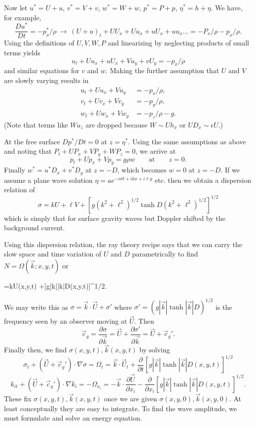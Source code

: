 Now let $u^*=U+u$, $v^*=V+v$, $w^*=W+w$, $p^*=P+p$, $\eta^*=h+\eta$. We
have, for example,
\[
	\frac{Du^*}{Dt}=-p_x^*/\rho
	\ \longrightarrow\
	(U+u)_t+UU_x+Uu_x+uU_x+uu_x\ldots=-P_x/\rho-p_x/\rho.
\]
Using the definitions of $U,V,W,P$ and linearizing by neglecting products of small
terms yields
\[
	u_t+Uu_x+uU_x+Vu_y+vU_y=-p_x/\rho
\]
and similar equations for $v$ and $w$. Making the further assumption that $U$ and $V$ are
slowly varying results in
\begin{align*}
	u_t+Uu_x+Vu_y & =-p_x/\rho,   \\
	v_t+Uv_x+Vv_y & =-p_y/\rho,   \\
	w_t+Uw_x+Vw_y & =-p_z/\rho-g.
\end{align*}
(Note that terms like $Wu_z$ are dropped because $W\sim Uh_x$ or $UD_x\sim\epsilon U$.)

\sourcepagebreak

At the free surface $Dp^*/Dt=0$ at $z=\eta^*$. Using the same assumptions as above
and noting that $P_t+UP_x+VP_y+WP_z=0$, we arrive at
\[
	p_t+Up_x+Vp_y=g\rho w\qquad\text{at}\qquad z=0.
\]
Finally $w^*=u^*D_x+v^*D_y$ at $z=-D$, which becomes $w=0$ at $z=-D$. If we assume
a plane wave solution $\eta=ae^{-i\sigma t+ikx+i\ell y}$ etc. then we obtain a dispersion relation of
\[
	\sigma=kU+\ell V+
	\left[g(k^2+\ell^2)^{1/2}\tanh D(k^2+\ell^2)^{1/2}\right]^{1/2}
\]
which is simply that for surface gravity waves but Doppler shifted by the background
current.

Using this dispersion relation, the ray theory recipe says that we can carry the
slow space and time variation of $U$ and $D$ parametrically to find
$N=\Omega(\vec k;x,y,t)$ or
\begin{waveequation}
	\sigma=\vec k\cdot\vec U(x,y,t)
		+[g|\vec k|\tanh|\vec k|D(x,y,t)]^{1/2}.
\end{waveequation}
We may write this as $\sigma=\vec k\cdot\vec U+\sigma'$ where
$\sigma'=(g|\vec k|\tanh|\vec k|D)^{1/2}$ is the frequency seen
by an observer moving at $\vec U$. Then
\[
	\vec c_g=\frac{\partial\sigma}{\partial\vec k}
	=\vec U+\frac{\partial\sigma'}{\partial\vec k}
	=\vec U+\vec c_g'.
\]
Finally then, we find $\sigma(x,y,t),\vec k(x,y,t)$ by solving
\[
	\sigma_t+(\vec U+\vec c_g')\cdot\nabla\sigma
	=\Omega_t
	=\vec k\cdot\vec U_t
	+\frac{\partial}{\partial t}[g|\vec k|\tanh|\vec k|D(x,y,t)]^{1/2}
\]
\[
	k_{it}+(\vec U+\vec c_g')\cdot\nabla k_i
	=-\Omega_{x_i}
	=-\vec k\cdot\frac{\partial\vec U}{\partial x_i}
	-\frac{\partial}{\partial x_i}[g|\vec k|\tanh|\vec k|D(x,y,t)]^{1/2}.
\]
These fix $\sigma(x,y,t),\vec k(x,y,t)$ once we are given
$\sigma(x,y,0),\vec k(x,y,0)$. At least conceptually they are easy to integrate. To find the wave amplitude, we must
formulate and solve an energy equation.

